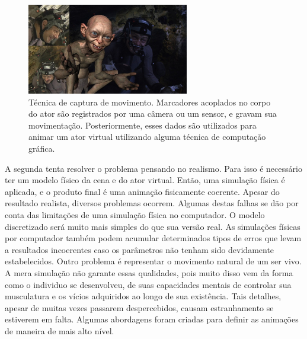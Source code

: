 \documentclass{article}
\begin{document}
\begin{figure}[ht]
  \centering
  \includegraphics[height=150px]{images/gollum_mocap.jpg}
  \caption{Técnica de captura de movimento. Marcadores acoplados no corpo do ator são registrados por uma câmera ou um sensor, e gravam sua movimentação. Posteriormente, esses dados são utilizados para animar um ator virtual utilizando alguma técnica de computação gráfica.}
  \label{fig:mocap}
\end{figure}

A segunda tenta resolver o problema pensando no realismo. Para isso é necessário ter um modelo físico da cena e do ator virtual. Então, uma simulação física é aplicada, e o produto final é uma animação fisicamente coerente. Apesar do resultado realista, diversos problemas ocorrem. Algumas destas falhas se dão por conta das limitações de uma simulação física no computador. O modelo discretizado será muito mais simples do que sua versão real. As simulações físicas por computador também podem acumular determinados tipos de erros que levam a resultados incoerentes caso os parâmetros não tenham sido devidamente estabelecidos. Outro problema é representar o movimento natural de um ser vivo. A mera simulação não garante essas qualidades, pois muito disso vem da forma como o individuo se desenvolveu, de suas capacidades mentais de controlar sua musculatura e os vícios adquiridos ao longo de sua existência. Tais detalhes, apesar de muitas vezes passarem despercebidos, causam estranhamento se estiverem em falta. \cite{bib:1985:Wilhelms} \cite{bib:1985:Armstrong} Algumas abordagens foram criadas para definir as animações de maneira de mais alto nível. \cite{bib:1994:Panne}
\end{document}
